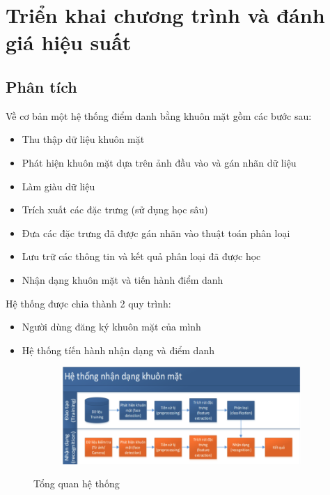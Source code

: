 \chapter{Triển khai chương trình và đánh giá hiệu suất}
\label{cha:chap3}

\section{Phân tích}
Về cơ bản một hệ thống điểm danh bằng khuôn mặt gồm các bước sau:
\begin{itemize}
    \item Thu thập dữ liệu khuôn mặt
    \item Phát hiện khuôn mặt dựa trên ảnh đầu vào và gán nhãn dữ liệu
    \item Làm giàu dữ liệu
    \item Trích xuất các đặc trưng (sử dụng học sâu)
    \item Đưa các đặc trưng đã được gán nhãn vào thuật toán phân loại
    \item Lưu trữ các thông tin và kết quả phân loại đã được học
    \item Nhận dạng khuôn mặt và tiến hành điểm danh
\end{itemize}

Hệ thống được chia thành 2 quy trình:
\begin{itemize}
    \item Người dùng đăng ký khuôn mặt của mình
    \item Hệ thống tíến hành nhận dạng và điểm danh
\end{itemize}

\begin{figure}
    \begin{subfigure}{1.\textwidth}
        \includegraphics[width=1.\linewidth]{Chapters/items/chap3_1.jpg}
        \label{fig:chap3_1}
    \end{subfigure}
    \caption{Tổng quan hệ thống}
\end{figure}


